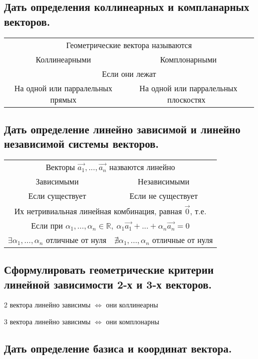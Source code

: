 \documentclass[a4paper, 10pt]{article}
\newcommand{\mcol}[1]{\multicolumn{2}{c}{#1}}
\newcommand{\nul}{\vec{0}}
\begin{document}
\subsection{Дать определения коллинеарных и компланарных векторов.}

\begin{center}
\begin{tabular}{c c} 
    \mcol{Геометрические вектора называются}\\
    Коллинеарными & Комплонарными\\
    \mcol{Если они лежат }\\
    На одной или парралельных прямых & На одной или парралельных плоскостях \\
\end{tabular}
\end{center}

\subsection{Дать определение линейно зависимой и линейно независимой системы векторов.}

\begin{center}
\begin{tabular}{c c} 
    \mcol{Векторы $\vec{a_1},...,\vec{a_n}$ назваются линейно}\\
    Зависимыми & Независимыми\\
    Если существует & Если не существует\\
    \mcol{Их нетривиальная линейная комбинация, равная $\nul$, т.е.}\\
    \mcol{Если при $\alpha_1,...,\alpha_n \in \mathbb{R}, \ \alpha_1 \vec{a_1} +...+ \alpha_n \vec{a_n} = 0$ }\\
    $\exists \alpha_1,...,\alpha_n$ отличные от нуля & $\nexists \alpha_1,...,\alpha_n$ отличные от нуля \\
\end{tabular}
\end{center}

\subsection{Сформулировать геометрические критерии линейной зависимости 2-х и 3-х векторов.}

2 вектора линейно зависимы $\iff$ они коллинеарны

3 вектора линейно зависимы $\iff$ они комплонарны

\subsection{Дать определение базиса и координат вектора.}
\end{document}
